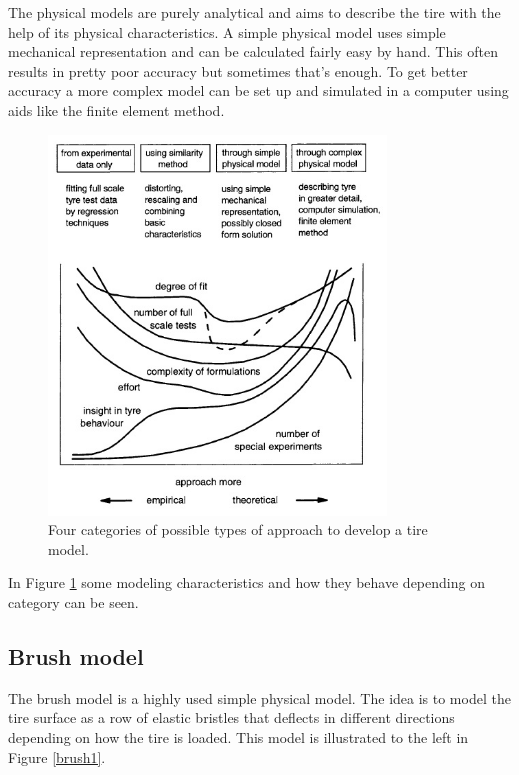 The physical models are purely analytical and aims to describe the tire with the help of its physical characteristics. A simple physical model uses simple mechanical representation and can be calculated fairly easy by hand. This often results in pretty poor accuracy but sometimes that's enough. To get better accuracy a more complex model can be set up and simulated in a computer using aids like the finite element method. 

\begin{figure}[h]
	\centering
	\includegraphics[width=0.8\textwidth]{Pictures/tire_modeling}
	\caption{Four categories of possible types of approach to develop a tire model. \cite{pacejka}}
	\label{tire_modeling}
\end{figure}

In Figure \ref{tire_modeling} some modeling characteristics and how they behave depending on category can be seen.

\subsection{Brush model}
\label{sec:brush}
The brush model is a highly used simple physical model. The idea is to model the tire surface as a row of elastic bristles that deflects in different directions depending on how the tire is loaded. This model is illustrated to the left in Figure \ref{brush1}.

